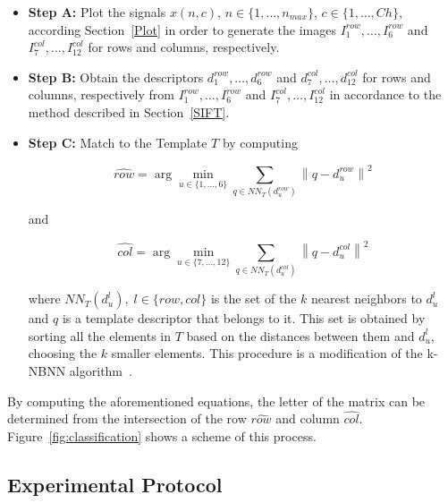 \documentclass[utf8]{frontiersSCNS} %
\begin{document}
\begin{itemize}

\item \textbf{Step A:}\label{paso4} Plot the signals $x(n,c)$,  $n \in \{1, \dots, n_{max}\}$, $c \in \{1,\dots,Ch\}$,  according Section~\ref{Plot} in order to generate the images $I^{row}_1, \dots, I^{row}_6$ and $I^{col}_7,\dots,I^{col}_{12}$ for rows and columns, respectively. 

\item \textbf{Step B:} Obtain the descriptors $ d^{row}_1, \dots,  d^{row}_6 $  and  $ d^{col}_7, \dots,  d^{col}_{12} $ for rows and columns, respectively from $I^{row}_1, \dots, I^{row}_6$ and $I^{col}_7,\dots,I^{col}_{12}$  in accordance to the method described in Section~\ref{SIFT}. 

\item \textbf{Step C:} Match to the Template $T$ by computing  

\begin{equation}
\hat{row} = \arg \min_{u \in \{1,\dots,6\}} \sum_{q \in NN_T(d^{row}_u)}^{} \left\lVert q -  d^{row}_u \right\rVert ^2
\label{eq:multiclassificationrow}
\end{equation}

\noindent and

\begin{equation}
\hat{col} = \arg \min_{u \in \{7,\dots,12\}} \sum_{q \in NN_T(d^{col}_u)}^{} \left\lVert q -  d^{col}_u \right\rVert ^2
\label{eq:multiclassificationcol}
\end{equation}

\noindent where $NN_T(d^l_u),\;l\in\{row,{col}\}$  is the set of the $k$ nearest neighbors to $d^l_u$ and $q$ is a template descriptor that belongs to it.  This set is obtained by sorting all the elements in $T$ based on the distances between them and $d^l_u$, choosing the $k$ smaller elements. This procedure is a modification of the k-NBNN  algorithm~\citep{Boiman2008}.

\end{itemize}
By computing the aforementioned equations, the letter of the matrix can be determined from the intersection of the row $ \hat{row} $ and column $ \hat{col} $. 
Figure~\ref{fig:classification} shows a scheme of this process. 

\subsection{Experimental Protocol} \label{Protocol}
\end{document}
